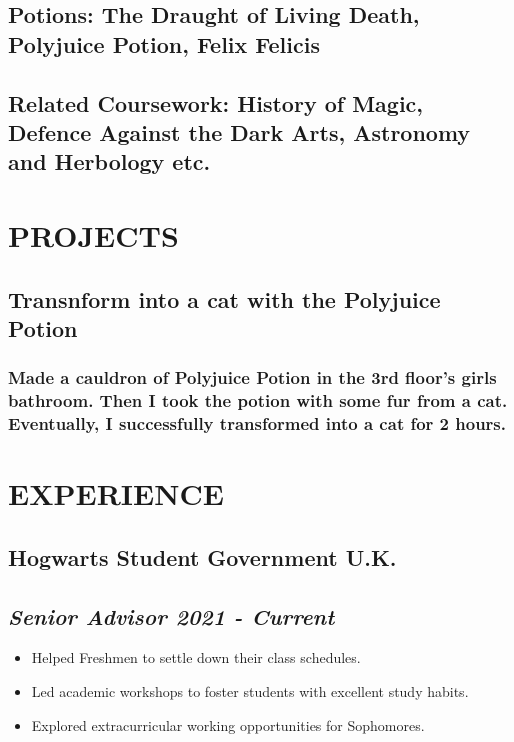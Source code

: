 \documentclass{danwyk_resume}[2022/01/23]
\begin{document}
\begin{spacing}{0.5}
\subsection{\bf Potions: \mdseries The Draught of Living Death, Polyjuice Potion, Felix Felicis}
\subsection{\bf Related Coursework: \mdseries History of Magic, Defence Against the Dark Arts, Astronomy and Herbology etc.}

\section{PROJECTS}
\subsection{\bf Transnform into a cat with the Polyjuice Potion}
\subsubsection{Made a cauldron of Polyjuice Potion in the 3rd floor's girls bathroom. Then I took the potion with some fur from a cat. Eventually, I successfully transformed into a cat for 2 hours.}

\section{EXPERIENCE}
\subsection{\bf Hogwarts Student Government \mdseries\hfill U.K.}
\subsection{\itshape Senior Advisor \upshape\hfill 2021 - Current}
    \begin{itemize}
    \setlength{\itemsep}{0pt}
    \setlength{\parsep}{0pt}
    \setlength{\parskip}{5pt}
        \item Helped Freshmen to settle down their class schedules.
        \item Led academic workshops to foster students with excellent study habits.
        \item Explored extracurricular working opportunities for Sophomores.
    \end{itemize}
    

\end{spacing}
\end{document}
